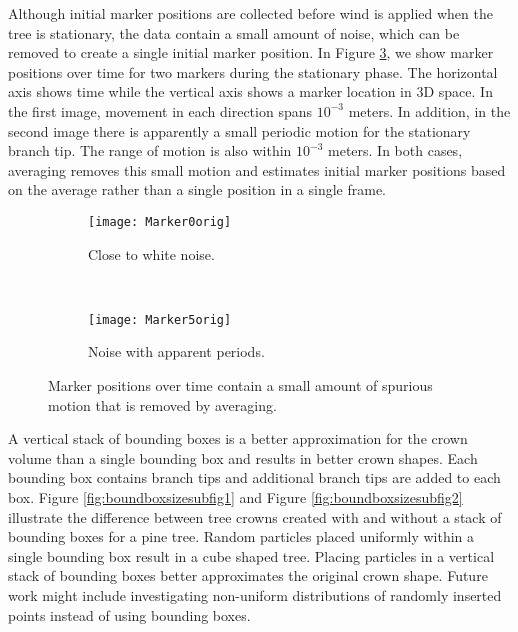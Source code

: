 Although initial marker positions are collected before wind is applied when the tree is stationary, the data contain a small amount of noise, which can be removed to create a single initial marker position. In Figure \ref{fig:markerPath}, we show marker positions over time for two markers during the stationary phase. The horizontal axis shows time while the vertical axis shows a marker location in 3D space. In the first image, movement in each direction spans $10^{-3}$ meters. In addition, in the second image there is apparently a small periodic motion for the stationary branch tip. The range of motion is also within $10^{-3}$ meters. In both cases, averaging removes this small motion and estimates initial marker positions based on the average rather than a single position in a single frame.

\begin{figure}
\centering
        \begin{subfigure}[b]{0.42\textwidth}
                \centering
                \texttt{[image: Marker0orig]}
                \caption{Close to white noise.}
                \label{fig:markerPathsubfig1}
        \end{subfigure}
        ~
        \begin{subfigure}[b]{0.42\textwidth}
                \centering
                \texttt{[image: Marker5orig]}
                \caption{Noise with apparent periods.}
                \label{fig:markerPathsubfig2}
        \end{subfigure}     
        \caption[Remove spurious motion. ]{Marker positions over time contain a small amount of spurious motion that is removed by averaging.}
        \label{fig:markerPath}
\end{figure}

A vertical stack of bounding boxes is a better approximation for the crown volume than a single bounding box and results in better crown shapes. Each bounding box contains branch tips and additional branch tips are added to each box. Figure \ref{fig:boundboxsizesubfig1} and Figure \ref{fig:boundboxsizesubfig2} illustrate the difference between tree crowns created with and without a stack of bounding boxes for a pine tree. Random particles placed uniformly within a single bounding box result in a cube shaped tree. Placing particles in a vertical stack of bounding boxes better approximates the original crown shape. Future work might include investigating non-uniform distributions of randomly inserted points instead of using bounding boxes. 

